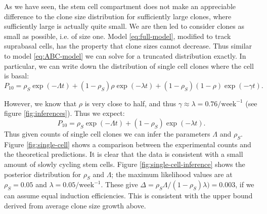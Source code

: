 \documentclass[10pt,UKenglish]{article}
\begin{document}
As we have seen, the stem cell compartment does not make an appreciable
difference to the clone size distribution for sufficiently large clones, where
sufficiently large is actually quite small. We are then led to consider clones
as small as possible, i.e. of size one. Model \ref{eq:full-model}, modified to
track suprabasal cells, has the property that clone sizes cannot decrease. Thus
similar to model \ref{eq:ABC-model} we can solve for a truncated distribution
exactly. In particular, we can write down the distribution of single cell clones
where the cell is basal:
\begin{equation*}
P_{10} = \rho_S \exp(-\Lambda t) + (1-\rho_S) \rho \exp(-\lambda t) + (1-\rho_S) (1-\rho) \exp(-\gamma t).
\end{equation*}

However, we know that $\rho$ is very close to half, and thus $\gamma \approx \lambda = 0.76/\textrm{week}^{-1}$ (see figure \ref{fig:inferences}). Thus we expect: 
\begin{equation*}
P_{10} = \rho_S \exp(-\Lambda t) + (1-\rho_S) \exp(-\lambda t).
\end{equation*}
Thus given counts of single cell clones we can infer the parameters $\Lambda$
and $\rho_S$. Figure \ref{fig:single-cell} shows a comparison between the
experimental counts and the theoretical predictions. It is clear that the data
is consistent with a small amount of slowly cycling stem cells. Figure
\ref{fig:single-cell-inference} shows the posterior distribution for $\rho_S$
and $\Lambda$; the maximum likelihood values are at $\rho_S = 0.05$ and $\lambda
= 0.05/\textrm{week}^{-1}$. These give $\Delta = \rho_S \Lambda / (1-\rho_S)
\lambda) = 0.003$, if we can assume equal induction efficiencies. This is
consistent with the upper bound derived from average clone size growth above.
\end{document}
